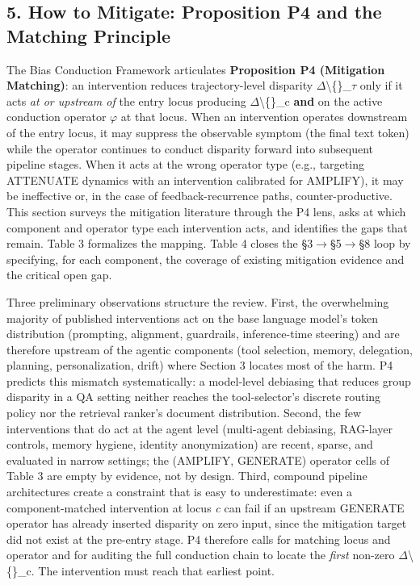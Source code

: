 \documentclass[10pt]{article}
\begin{document}
\subsection*{5. How to Mitigate: Proposition P4 and the Matching Principle}

The Bias Conduction Framework articulates \textbf{Proposition P4 (Mitigation Matching)}: an intervention reduces trajectory-level disparity $\Delta$\textbackslash\{\}\_$\tau$ only if it acts \emph{at or upstream of} the entry locus producing $\Delta$\textbackslash\{\}\_c \textbf{and} on the active conduction operator $\varphi$ at that locus. When an intervention operates downstream of the entry locus, it may suppress the observable symptom (the final text token) while the operator continues to conduct disparity forward into subsequent pipeline stages. When it acts at the wrong operator type (e.g., targeting ATTENUATE dynamics with an intervention calibrated for AMPLIFY), it may be ineffective or, in the case of feedback-recurrence paths, counter-productive. This section surveys the mitigation literature through the P4 lens, asks at which component and operator type each intervention acts, and identifies the gaps that remain. Table 3 formalizes the mapping. Table 4 closes the \S{}3$\rightarrow$\S{}5$\rightarrow$\S{}8 loop by specifying, for each component, the coverage of existing mitigation evidence and the critical open gap.

Three preliminary observations structure the review. First, the overwhelming majority of published interventions act on the base language model's token distribution (prompting, alignment, guardrails, inference-time steering) and are therefore upstream of the agentic components (tool selection, memory, delegation, planning, personalization, drift) where Section 3 locates most of the harm. P4 predicts this mismatch systematically: a model-level debiasing that reduces group disparity in a QA setting neither reaches the tool-selector's discrete routing policy nor the retrieval ranker's document distribution. Second, the few interventions that do act at the agent level (multi-agent debiasing, RAG-layer controls, memory hygiene, identity anonymization) are recent, sparse, and evaluated in narrow settings; the (AMPLIFY, GENERATE) operator cells of Table 3 are empty by evidence, not by design. Third, compound pipeline architectures create a constraint that is easy to underestimate: even a component-matched intervention at locus \emph{c} can fail if an upstream GENERATE operator has already inserted disparity on zero input, since the mitigation target did not exist at the pre-entry stage. P4 therefore calls for matching locus and operator and for auditing the full conduction chain to locate the \emph{first} non-zero $\Delta$\textbackslash\{\}\_c. The intervention must reach that earliest point.
\end{document}
